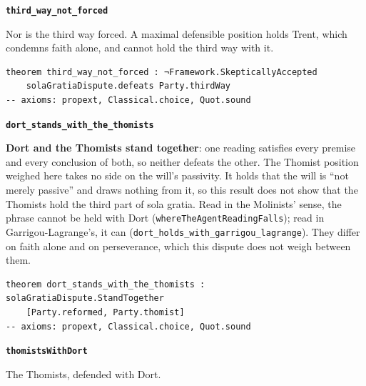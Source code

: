 \documentclass[11pt]{article}
\begin{document}
\par\medskip\noindent\textbf{\texttt{third\_\allowbreak{}way\_\allowbreak{}not\_\allowbreak{}forced}}\par\nobreak\noindent
Nor is the third way forced. A maximal defensible position holds Trent, which condemns faith alone, and cannot hold the third way with it.

{\small\begin{verbatim}
theorem third_way_not_forced : ¬Framework.SkepticallyAccepted
    solaGratiaDispute.defeats Party.thirdWay
-- axioms: propext, Classical.choice, Quot.sound
\end{verbatim}}
\par\medskip\noindent\textbf{\texttt{dort\_\allowbreak{}stands\_\allowbreak{}with\_\allowbreak{}the\_\allowbreak{}thomists}}\par\nobreak\noindent
\textbf{Dort and the Thomists stand together}: one reading satisfies every premise and every conclusion of both, so neither defeats the other. The Thomist position weighed here takes no side on the will’s passivity. It holds that the will is “not merely passive” and draws nothing from it, so this result does not show that the Thomists hold the third part of sola gratia. Read in the Molinists’ sense, the phrase cannot be held with Dort (\texttt{where\allowbreak{}The\allowbreak{}Agent\allowbreak{}Reading\allowbreak{}Falls}); read in Garrigou-Lagrange’s, it can (\texttt{dort\_\allowbreak{}holds\_\allowbreak{}with\_\allowbreak{}garrigou\_\allowbreak{}lagrange}). They differ on faith alone and on perseverance, which this dispute does not weigh between them.

{\small\begin{verbatim}
theorem dort_stands_with_the_thomists : solaGratiaDispute.StandTogether
    [Party.reformed, Party.thomist]
-- axioms: propext, Classical.choice, Quot.sound
\end{verbatim}}
\par\medskip\noindent\textbf{\texttt{thomists\allowbreak{}With\allowbreak{}Dort}}\par\nobreak\noindent
The Thomists, defended with Dort.
\end{document}
